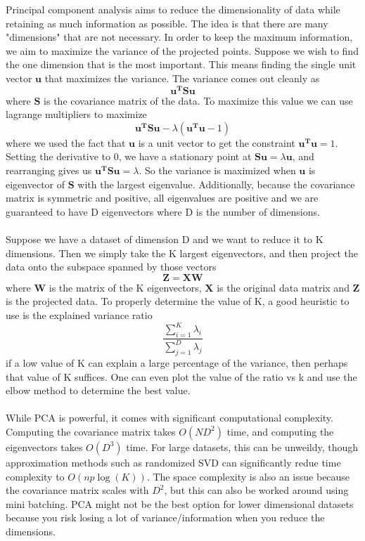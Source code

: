 \documentclass[11pt]{article}
\begin{document}
\noindent Principal component analysis aims to reduce the dimensionality of data while retaining as much information as possible. The idea is that there are many "dimensions" that are not necessary.
In order to keep the maximum information, we aim to maximize the variance of the projected points. Suppose we wish to find the one dimension that is the most important. This means finding the single 
unit vector \(\mathbf{u}\) that maximizes the variance. The variance comes out cleanly as
\[
    \mathbf{u^T S u}
\]
\noindent where \(\mathbf{S}\) is the covariance matrix of the data. To maximize this value we can use lagrange multipliers to maximize
\[
    \mathbf{u^T S u} - \lambda(\mathbf{u^T u} - 1)
\]
\noindent where we used the fact that \(\mathbf{u}\) is a unit vector to get the constraint \(\mathbf{u^T u} = 1\). Setting the derivative to 0, we have a stationary point at \(\mathbf{Su} = \lambda\mathbf{u}\),
and rearranging gives us \(\mathbf{u^T S u} = \lambda\). So the variance is maximized when \(\mathbf{u}\) is eigenvector of \(\mathbf{S}\) with the largest eigenvalue. Additionally, because the covariance matrix 
is symmetric and positive, all eigenvalues are positive and we are guaranteed to have D eigenvectors where D is the number of dimensions.
\\
\\
\noindent Suppose we have a dataset of dimension D and we want to reduce it to K dimensions. Then we simply take the K largest eigenvectors, and then project the data onto the subspace spanned by those vectors
\[
    \mathbf{Z} = \mathbf{XW}
\]
where \(\mathbf{W}\) is the matrix of the K eigenvectors, \(\mathbf{X}\) is the original data matrix and \(\mathbf{Z}\) is the projected data. To properly determine the value of K, a good heuristic to use is the 
explained variance ratio
\[
    \frac{\sum^K_{i = 1}\lambda_i}{\sum^D_{j = 1}\lambda_j}
\]
if a low value of K can explain a large percentage of the variance, then perhaps that value of K suffices. One can even plot the value of the ratio vs k and use the elbow method to determine the best value.
\\
\\
\noindent While PCA is powerful, it comes with significant computational complexity. Computing the covariance matrix takes \(O(ND^2)\) time, and computing the eigenvectors takes \(O(D^3)\) time. For large datasets,
this can be unweildy, though approximation methods such as randomized SVD can significantly redue time complexity to \(O(np\log(K))\). The space complexity is also an issue because the covariance matrix scales with
\(D^2\), but this can also be worked around using mini batching. PCA might not be the best option for lower dimensional datasets because you risk losing a lot of variance/information when you reduce the dimensions.
\end{document}
